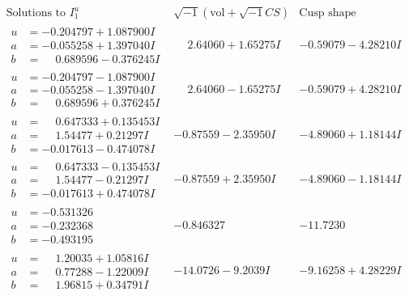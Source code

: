 \documentclass[1p]{elsarticle_modified}
\theoremstyle{definition}
\newcommand{\I}{\sqrt{-1}}
\begin{document}
$$\begin{array}{c|c|c}  
\text{Solutions to }I^u_{1}& \I (\text{vol} + \sqrt{-1}CS) & \text{Cusp shape}\\
 \hline 
\begin{aligned}
u &= -0.204797 + 1.087900 I \\
a &= -0.055258 + 1.397040 I \\
b &= \phantom{-}0.689596 - 0.376245 I\end{aligned}
 & \phantom{-}2.64060 + 1.65275 I & -0.59079 - 4.28210 I \\ \hline\begin{aligned}
u &= -0.204797 - 1.087900 I \\
a &= -0.055258 - 1.397040 I \\
b &= \phantom{-}0.689596 + 0.376245 I\end{aligned}
 & \phantom{-}2.64060 - 1.65275 I & -0.59079 + 4.28210 I \\ \hline\begin{aligned}
u &= \phantom{-}0.647333 + 0.135453 I \\
a &= \phantom{-}1.54477 + 0.21297 I \\
b &= -0.017613 - 0.474078 I\end{aligned}
 & -0.87559 - 2.35950 I & -4.89060 + 1.18144 I \\ \hline\begin{aligned}
u &= \phantom{-}0.647333 - 0.135453 I \\
a &= \phantom{-}1.54477 - 0.21297 I \\
b &= -0.017613 + 0.474078 I\end{aligned}
 & -0.87559 + 2.35950 I & -4.89060 - 1.18144 I \\ \hline\begin{aligned}
u &= -0.531326\phantom{ +0.000000I} \\
a &= -0.232368\phantom{ +0.000000I} \\
b &= -0.493195\phantom{ +0.000000I}\end{aligned}
 & -0.846327\phantom{ +0.000000I} & -11.7230\phantom{ +0.000000I} \\ \hline\begin{aligned}
u &= \phantom{-}1.20035 + 1.05816 I \\
a &= \phantom{-}0.77288 - 1.22009 I \\
b &= \phantom{-}1.96815 + 0.34791 I\end{aligned}
 & -14.0726 - 9.2039 I & -9.16258 + 4.28229 I \\ \hline\begin{aligned}

\end{aligned}
\end{array}$$
\end{document}
